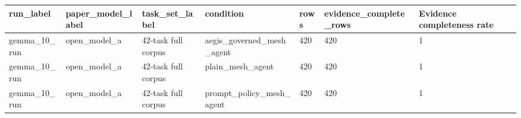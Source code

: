 \begin{tabular}{lllllll}
 \hline
run\_label & paper\_model\_label & task\_set\_label & condition & rows & evidence\_complete\_rows & Evidence completeness rate \\
 \hline
gemma\_10\_run & open\_model\_a & 42-task full corpus & aegis\_governed\_mesh\_agent & 420 & 420 & 1 \\
gemma\_10\_run & open\_model\_a & 42-task full corpus & plain\_mesh\_agent & 420 & 420 & 1 \\
gemma\_10\_run & open\_model\_a & 42-task full corpus & prompt\_policy\_mesh\_agent & 420 & 420 & 1 \\
 \hline
\end{tabular}

